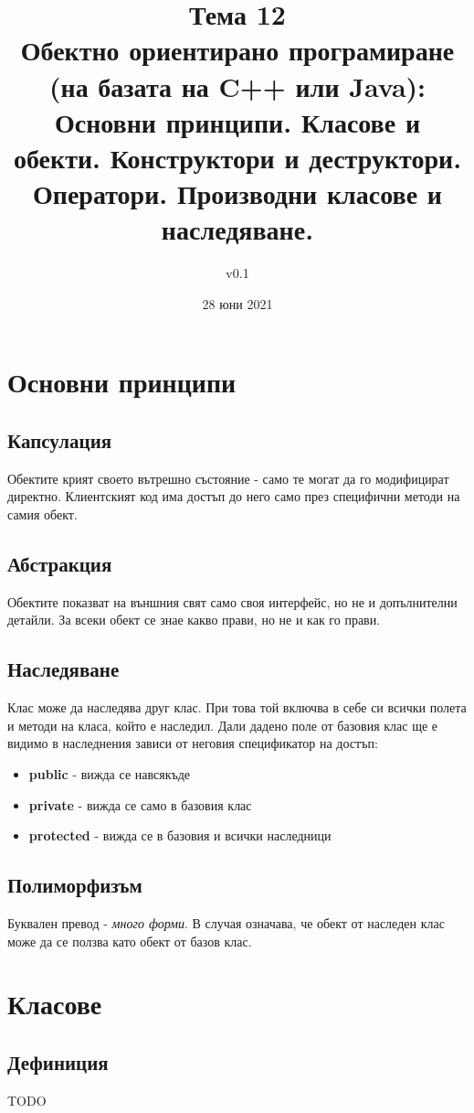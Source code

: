 \documentclass[fleqn,12pt]{article}
\title{Тема 12\\Обектно ориентирано програмиране (на базата на C++ или Java): Основни
принципи. Класове и обекти. Конструктори и деструктори. Оператори.
Производни класове и наследяване.}
\author{v0.1}
\date{28 юни 2021}
\begin{document}
\maketitle

\tableofcontents

\section{Основни принципи}
\subsection{Капсулация}
Обектите крият своето вътрешно състояние - само те могат да го модифицират директно. 
Клиентският код има достъп до него само през специфични методи на самия обект.

\subsection{Абстракция}
Обектите показват на външния свят само своя интерфейс, но не и допълнителни детайли. 
За всеки обект се знае какво прави, но не и как го прави.

\subsection{Наследяване}
Клас може да наследява друг клас. При това той включва в себе си всички полета и методи на класа, който е наследил.
Дали дадено поле от базовия клас ще е видимо в наследнения зависи от неговия спецификатор на достъп:
\begin{itemize}
    \item \textbf{public} - вижда се навсякъде
    \item \textbf{private} - вижда се само в базовия клас
    \item \textbf{protected} - вижда се в базовия и всички наследници
\end{itemize}

\subsection{Полиморфизъм}
Буквален превод - \textit{много форми}. В случая означава, че обект от наследен клас може да се ползва
като обект от базов клас.

\section{Класове}
\subsection{Дефиниция}
TODO
\end{document}
